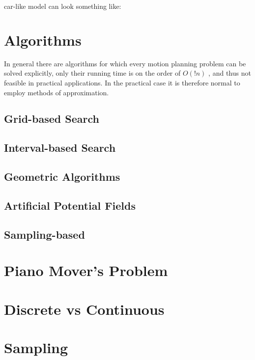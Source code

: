 car-like model can look something like:

\section{Algorithms}
In general there are algorithms for which every motion planning problem can be
solved explicitly, only their running time is on the order of \(O(!n)\) , and thus
not feasible in practical applications. In the practical case it is therefore
normal to employ methods of approximation.

\subsection{Grid-based Search}
\label{subsec:gridbasedsearch}

\subsection{Interval-based Search}
\label{subsec:intervalbasedsearch}

\subsection{Geometric Algorithms}
\label{subsec:geometricalgorithms}

\subsection{Artificial Potential Fields}
\label{subsec:artificialpotentialfields}

\subsection{Sampling-based}
\label{subsec:samplingbased}









\section{Piano Mover's Problem}

\section{Discrete vs Continuous}

\section{Sampling}

